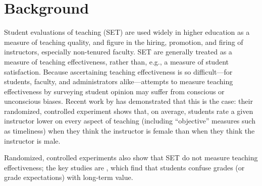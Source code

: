 \documentclass[12pt]{article}
\begin{document}
\section{Background}
Student evaluations of teaching (SET) are used widely in higher education 
as a measure of teaching quality,
and figure in the hiring, promotion, and firing of instructors, especially non-tenured faculty.
SET are generally treated as a measure of teaching effectiveness, rather than, e.g., a measure of student satisfaction.
Because ascertaining teaching effectiveness is so difficult---for students,
faculty, and administrators alike---attempts to measure teaching effectiveness by
surveying student opinion may suffer from conscious or unconscious biases. 
Recent work by \citet{mcNellEtal14} has demonstrated that this is the case: 
their randomized, controlled experiment shows that, on average, students rate a given instructor
lower on every aspect of teaching (including ``objective'' measures such as
timeliness) when they think the instructor is female than when 
they think the instructor is male.

Randomized, controlled experiments also show that SET do not measure
teaching effectiveness; the key studies are \citet{carrellWest10,bragaEtal11},
which find that students confuse grades (or grade expectations) with long-term
value.
\end{document}
